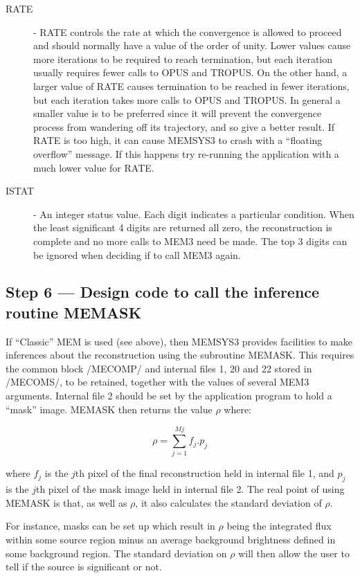 \begin {description}
\item [RATE] - RATE controls the rate at which the convergence is allowed to
proceed and should normally have a value of the order of unity. Lower values
cause more iterations to be required to reach termination, but each iteration
usually requires fewer calls to OPUS and TROPUS. On the other hand, a larger
value of RATE causes termination to be reached in fewer iterations, but each
iteration takes more calls to OPUS and TROPUS. In general a smaller value is to
be preferred since it will prevent the convergence process from wandering off
its  trajectory, and so give a better result. If RATE is too high, it can cause
MEMSYS3 to crash with a ``floating overflow'' message. If this happens try
re-running the application with a much lower value for RATE.

\item [ISTAT] - An integer status value. Each digit indicates a particular
condition. When the least significant 4 digits are returned all zero, the
reconstruction is complete and no more calls to MEM3 need be made. The top 3
digits can be ignored when deciding if to call MEM3 again.
\end {description}

\subsection {Step 6 --- Design code to call the inference routine MEMASK}

If ``Classic'' MEM is used (see above), then MEMSYS3 provides facilities to
make  inferences about the reconstruction using the subroutine MEMASK. This
requires  the common block /MECOMP/ and internal files 1, 20 and 22 stored in
/MECOMS/, to  be retained, together with the values of several MEM3 arguments.
Internal file 2  should be set by the application program to hold a ``mask''
image. MEMASK  then returns the value $\rho$ where:

\begin {equation}
\rho=\sum_{j=1}^{Mj} f_{j}.p_{j}
\end {equation}

where $f_{j}$ is the $j$th pixel of the final reconstruction held in internal
file 1, and $p_{j}$ is the $j$th pixel of the mask image held in internal file
2. The real point of using MEMASK is that, as well as $\rho$, it also
calculates the standard deviation of $\rho$.

For instance, masks can be set up which result in $\rho$ being the integrated
flux within some source region minus an average background brightness defined
in  some background region. The standard deviation on $\rho$ will then allow
the  user to tell if the source is significant or not.

